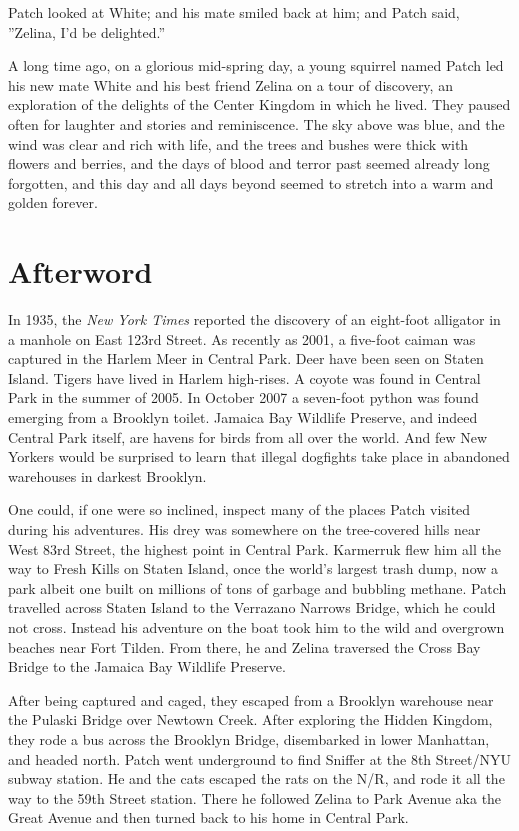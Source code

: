 \documentclass[12pt]{book}
\begin{document}
Patch looked at White; and his mate smiled back at him; and Patch said, ''Zelina, I'd be delighted.''

A long time ago, on a glorious mid-spring day, a young squirrel named Patch led his new mate White and his best friend Zelina on a tour of discovery, an exploration of the delights of the Center Kingdom in which he lived. They paused often for laughter and stories and reminiscence. The sky above was blue, and the wind was clear and rich with life, and the trees and bushes were thick with flowers and berries, and the days of blood and terror past seemed already long forgotten, and this day and all days beyond seemed to stretch into a warm and golden forever. 


\section{Afterword}

In 1935, the {\it New York Times} reported the discovery of an eight-foot alligator in a manhole on East 123rd Street. As recently as 2001, a five-foot caiman was captured in the Harlem Meer in Central Park. Deer have been seen on Staten Island. Tigers have lived in Harlem high-rises. A coyote was found in Central Park in the summer of 2005. In October 2007 a seven-foot python was found emerging from a Brooklyn toilet. Jamaica Bay Wildlife Preserve, and indeed Central Park itself, are havens for birds from all over the world. And few New Yorkers would be surprised to learn that illegal dogfights take place in abandoned warehouses in darkest Brooklyn.

One could, if one were so inclined, inspect many of the places Patch visited during his adventures. His drey was somewhere on the tree-covered hills near West 83rd Street, the highest point in Central Park. Karmerruk flew him all the way to Fresh Kills on Staten Island, once the world's largest trash dump, now a park %
albeit one built on millions of tons of garbage and bubbling methane. Patch travelled across Staten Island to the Verrazano Narrows Bridge, which he could not cross. Instead his adventure on the boat took him to the wild and overgrown beaches near Fort Tilden. From there, he and Zelina traversed the Cross Bay Bridge to the Jamaica Bay Wildlife Preserve.

After being captured and caged, they escaped from a Brooklyn warehouse near the Pulaski Bridge over Newtown Creek. After exploring the Hidden Kingdom, they rode a bus across the Brooklyn Bridge, disembarked in lower Manhattan, and headed north. Patch went underground to find Sniffer at the 8th Street/NYU subway station. He and the cats escaped the rats on the N/R, and rode it all the way to the 59th Street station. There he followed Zelina to Park Avenue %
aka the Great Avenue %
and then turned back to his home in Central Park.
\end{document}
